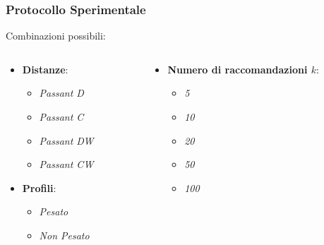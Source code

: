 \documentclass{beamer}
\begin{document}
\begin{frame}
	\frametitle{Protocollo Sperimentale}
	Combinazioni possibili:
	\begin{columns}[t]
		\begin{column}{0.5\textwidth}
				\begin{itemize}
					\setlength{\itemsep}{10pt}
					\item<1-> \textbf{Distanze}:
					\begin{itemize}
						\item \emph{Passant D}
						\item \emph{Passant C}
						\item \emph{Passant DW}
						\item \emph{Passant CW}
					\end{itemize}
					\item<2-> \textbf{Profili}:
					\begin{itemize}
						\item \emph{Pesato}
						\item \emph{Non Pesato}
					\end{itemize}
				\end{itemize}
		\end{column}
		\begin{column}{0.5\textwidth}
			\begin{itemize}
				\item<3-> \textbf{Numero di raccomandazioni $k$}:
				\begin{itemize}
					\item \emph{5}
					\item \emph{10}	
					\item \emph{20}
					\item \emph{50}
					\item \emph{100}
				\end{itemize}
			\end{itemize}
		\end{column}
	\end{columns}
	\end{frame}

\end{document}
